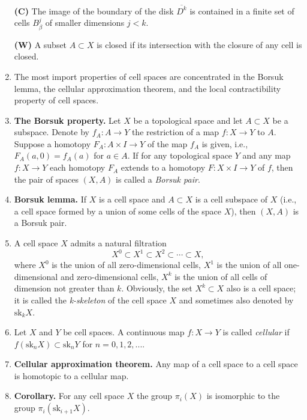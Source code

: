 \documentclass{ctexart}
\newcommand{\sk}[2]{\text{sk}_{#1}#2}
\begin{document}
\begin{enumerate}
\textbf{(C)} The image of the boundary of the disk $\overline{D^k}$ is
contained in a finite set of cells $B_\beta^j$ of smaller dimensions
$j < k$.

\textbf{(W)} A subset $A \subset X$ is closed if its intersection with
the closure of any cell is closed.

\item The most import properties of cell spaces are concentrated in
  the Borsuk lemma, the cellular approximation theorem, and the local
  contractibility property of cell spaces.

\item \textbf{The Borsuk property.} Let $X$ be a topological space and
  let $A \subset X$ be a subspace. Denote by $f_A : A \to Y$ the
  restriction of a map $f : X \to Y$ to $A$. Suppose a homotopy $F_A :
  A \times I \to Y$ of the map $f_A$ is given, i.e., $F_A(a,0) =
  f_A(a)$ for $a \in A$. If for any topological space $Y$ and any map
  $f : X \to Y$ each homotopy $F_A$ extends to a homotopy $F : X
  \times I \to Y$ of $f$, then the pair of spaces $(X,A)$ is called a
  \textit{Borsuk pair}.

\item \textbf{Borsuk lemma.} If $X$ is a cell space and $A \subset X$
  is a cell subspace of $X$ (i.e., a cell space formed by a union of
  some cells of the space $X$), then $(X,A)$ is a Borsuk pair.

\item A cell space $X$ admits a natural filtration
\[
X^0 \subset X^1 \subset X^2 \subset \cdots \subset X,
\]
where $X^0$ is the union of all zero-dimensional cells, $X^1$ is the
union of all one-dimensional and zero-dimensional cells, $X^k$ is the
union of all cells of dimension not greater than $k$. Obviously, the
set $X^k \subset X$ also is a cell space; it is called the
\textit{k-skeleton} of the cell space $X$ and sometimes also denoted
by $\sk{k}{X}$.

\item Let $X$ and $Y$ be cell spaces. A continuous map $f : X \to Y$
  is called \textit{cellular} if $f(\sk{n}{X}) \subset \sk{n}{Y}$ for $n
  = 0,1,2,...$.

\item \textbf{Cellular approximation theorem.} Any map of a cell space
  to a cell space is homotopic to a cellular map.

\item \textbf{Corollary.} For any cell space $X$ the group $\pi_i(X)$
  is isomorphic to the group $\pi_i(\sk{i+1}{X})$.


\end{enumerate}
\end{document}
